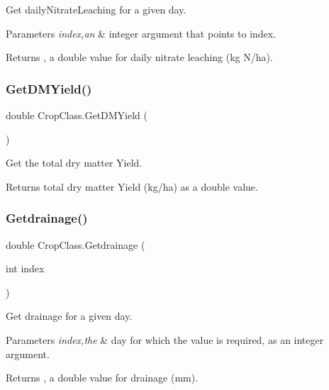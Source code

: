 Get daily\+Nitrate\+Leaching for a given day. 


\begin{DoxyParams}{Parameters}
{\em index,an} & integer argument that points to index. \\
\hline
\end{DoxyParams}
\begin{DoxyReturn}{Returns}
, a double value for daily nitrate leaching (kg N/ha). 
\end{DoxyReturn}
\mbox{\label{class_crop_class_a0daa0a0fed32eadc489bded6932a3d95}} 
\subsubsection{\texorpdfstring{GetDMYield()}{GetDMYield()}}
{\footnotesize\ttfamily double Crop\+Class.\+Get\+D\+M\+Yield (\begin{DoxyParamCaption}{ }\end{DoxyParamCaption})\hspace{0.3cm}{\ttfamily [inline]}}



Get the total dry matter Yield. 

\begin{DoxyReturn}{Returns}
total dry matter Yield (kg/ha) as a double value. 
\end{DoxyReturn}
\mbox{\label{class_crop_class_a98a0ffbeac8642db5748781f681653ce}} 
\subsubsection{\texorpdfstring{Getdrainage()}{Getdrainage()}}
{\footnotesize\ttfamily double Crop\+Class.\+Getdrainage (\begin{DoxyParamCaption}\item[{int}]{index }\end{DoxyParamCaption})\hspace{0.3cm}{\ttfamily [inline]}}



Get drainage for a given day. 


\begin{DoxyParams}{Parameters}
{\em index,the} & day for which the value is required, as an integer argument. \\
\hline
\end{DoxyParams}
\begin{DoxyReturn}{Returns}
, a double value for drainage (mm). 
\end{DoxyReturn}
\mbox{\label{class_crop_class_a71d200f742a1fc48262f0e6f81532fe6}} 
